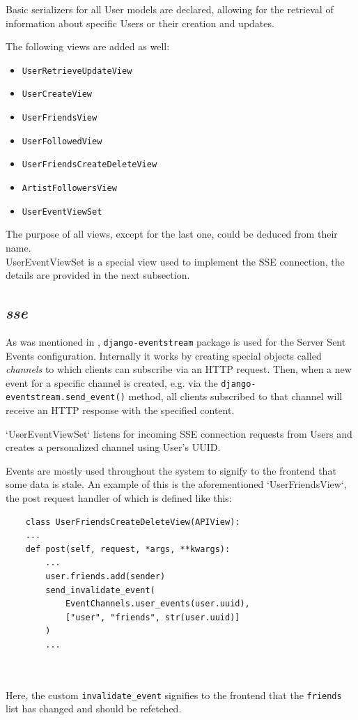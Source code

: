 Basic serializers for all User models are declared,
allowing for the retrieval of information about specific Users or their creation and updates.

The following views are added as well:
\begin{itemize}
    \item \texttt{UserRetrieveUpdateView}
    \item \texttt{UserCreateView}
    \item \texttt{UserFriendsView}
    \item \texttt{UserFollowedView}
    \item \texttt{UserFriendsCreateDeleteView}
    \item \texttt{ArtistFollowersView}
    \item \texttt{UserEventViewSet}
\end{itemize}

The purpose of all views, except for the last one, could be deduced from their name.\\
UserEventViewSet is a special view used to implement the SSE connection, the details are provided in the next subsection.

\subsection{\textit{sse}}
As was mentioned in , \texttt{django-eventstream} package is used for the Server Sent Events
configuration. Internally it works by creating special objects called \textit{channels} to which clients can subscribe
via an HTTP request. Then, when a new event for a specific channel is created,
e.g. via the \texttt{django-eventstream.send\_event()} method, all clients subscribed to that channel
will receive an HTTP response with the specified content.

`UserEventViewSet` listens for incoming SSE connection requests from Users and creates a personalized channel using User's UUID.

Events are mostly used throughout the system to signify to the frontend that some data is stale.
An example of this is the aforementioned `UserFriendsView`, the post request handler of which is defined like this:

\begin{minipage}{\textwidth}
    \begin{verbatim}
    class UserFriendsCreateDeleteView(APIView):
    ...
    def post(self, request, *args, **kwargs):
        ...
        user.friends.add(sender)
        send_invalidate_event(
            EventChannels.user_events(user.uuid),
            ["user", "friends", str(user.uuid)]
        )
        ...
    \end{verbatim}
\end{minipage}
\\
\\
Here, the custom \texttt{invalidate\_event} signifies to the frontend that the \texttt{friends} list has changed and should
be refetched.

